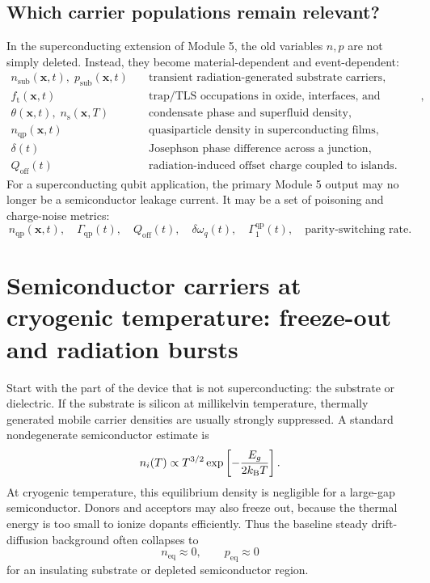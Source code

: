 \documentclass[11pt]{article}
\newcommand{\x}{\bm{x}}
\newcommand{\Ns}{n_{\mathrm{s}}}
\newcommand{\nqp}{n_{\mathrm{qp}}}
\newcommand{\GammaQP}{\Gamma_{\mathrm{qp}}}
\newcommand{\Qoff}{Q_{\mathrm{off}}}
\newcommand{\ft}{f_{\mathrm{t}}}
\begin{document}
\subsection{Which carrier populations remain relevant?}

In the superconducting extension of Module 5, the old variables \(n,p\) are not simply deleted. Instead, they become material-dependent and event-dependent:
\begin{align}
 n_{\mathrm{sub}}(\x,t),\;p_{\mathrm{sub}}(\x,t) &\quad \text{transient radiation-generated substrate carriers},\\
 \ft(\x,t) &\quad \text{trap/TLS occupations in oxide, interfaces, and junction barriers},\\
 \theta(\x,t),\;\Ns(\x,T) &\quad \text{condensate phase and superfluid density},\\
 \nqp(\x,t) &\quad \text{quasiparticle density in superconducting films},\\
 \delta(t) &\quad \text{Josephson phase difference across a junction},\\
 \Qoff(t) &\quad \text{radiation-induced offset charge coupled to islands}.
\end{align}
For a superconducting qubit application, the primary Module 5 output may no longer be a semiconductor leakage current. It may be a set of poisoning and charge-noise metrics:
\begin{equation}
\boxed{\nqp(\x,t),\quad \GammaQP(t),\quad \Qoff(t),\quad \delta\omega_q(t),\quad \Gamma_1^{\mathrm{qp}}(t),\quad \text{parity-switching rate}.}
\end{equation}

\section{Semiconductor carriers at cryogenic temperature: freeze-out and radiation bursts}

Start with the part of the device that is not superconducting: the substrate or dielectric. If the substrate is silicon at millikelvin temperature, thermally generated mobile carrier densities are usually strongly suppressed. A standard nondegenerate semiconductor estimate is
\begin{equation}
 n_i(T) \propto T^{3/2}\exp\left[-\frac{E_g}{2k_{\mathrm{B}} T}\right].
\end{equation}
At cryogenic temperature, this equilibrium density is negligible for a large-gap semiconductor. Donors and acceptors may also freeze out, because the thermal energy is too small to ionize dopants efficiently. Thus the baseline steady drift-diffusion background often collapses to
\begin{equation}
 n_{\mathrm{eq}}\approx 0,\qquad p_{\mathrm{eq}}\approx 0
\end{equation}
for an insulating substrate or depleted semiconductor region.
\end{document}

